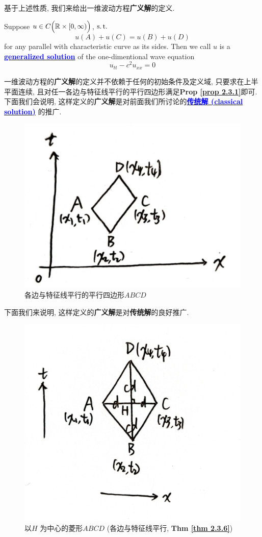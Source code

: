 	\newpage
	
	基于上述性质, 我们来给出一维波动方程\textbf{广义解}的定义. 
	
	\vspace*{1em}
	
	\begin{defn}\label{def 2.3.3}
		Suppose $u \in C \Big( \mathbb{R} \times [0 , \infty) \Big)$, $\operatorname{s.t.}$ 
		\[ u(A) + u(C) = u(B) + u(D) \]
		for any parallel with characteristic curve as its sides. Then we call $u$ is a \underline{\textcolor{blue}{\textbf{generalized solution}}} of the one-dimentional wave equation 
		\[ u_{tt} - c^2 u_{xx} = 0 \]
		
		\vspace*{2em}
		
		\begin{rmk}
			一维波动方程的\textbf{广义解}的定义并不依赖于任何的初始条件及定义域, 只要求在上半平面连续, 且对任一各边与特征线平行的平行四边形满足\textbf{Prop \ref{prop 2.3.1}}即可. 下面我们会说明, 这样定义的\textbf{广义解}是对前面我们所讨论的\underline{\textcolor{blue}{\textbf{传统解 (classical solution)}}} 的推广. 
		\end{rmk}
	\end{defn}
	
	\begin{figure}[thbp!]
		\centering
		\includegraphics[width=0.3\linewidth]{figure/2.3-8}
		\caption{各边与特征线平行的平行四边形$ABCD$}
		\label{pic : 2.3-8-1} %
	\end{figure}
	
	下面我们来说明, 这样定义的\textbf{广义解}是对\textbf{传统解}的良好推广. 
		
	\begin{figure}[thbp!]
		\centering
		\includegraphics[width=0.35\linewidth]{figure/2.3-9}
		\caption{以$H$ 为中心的菱形$ABCD$ (各边与特征线平行, \textbf{Thm \ref{thm 2.3.6}})}
		\label{pic : 2.3-9} %
	\end{figure}
	

